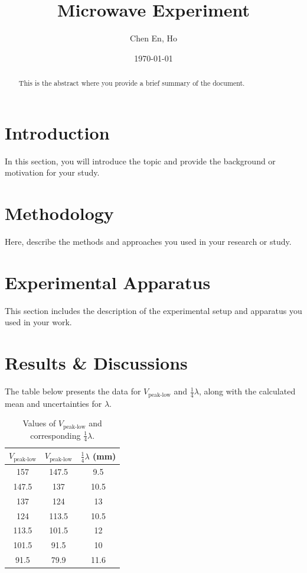 \documentclass{article}
\title{Microwave Experiment}
\author{Chen En, Ho}
\date{\today}
\begin{document}
\maketitle

\begin{abstract}
This is the abstract where you provide a brief summary of the document.
\end{abstract}

\section{Introduction}
In this section, you will introduce the topic and provide the background or motivation for your study.

\section{Methodology}
Here, describe the methods and approaches you used in your research or study.

\section{Experimental Apparatus}
This section includes the description of the experimental setup and apparatus you used in your work.

\section{Results \& Discussions}

The table below presents the data for \( V_{\text{peak-low}} \) and \( \frac{1}{4} \lambda \), along with the calculated mean and uncertainties for \( \lambda \).

\begin{table}[H]
    \centering
    \begin{tabular}{|c|c|c|}
        \hline
        \( V_{\text{peak-low}} \) & \( V_{\text{peak-low}} \) & \( \frac{1}{4} \lambda \) (mm) \\
        \hline
        157 & 147.5 & 9.5 \\
        147.5 & 137 & 10.5 \\
        137 & 124 & 13 \\
        124 & 113.5 & 10.5 \\
        113.5 & 101.5 & 12 \\
        101.5 & 91.5 & 10 \\
        91.5 & 79.9 & 11.6 \\
        \hline
    \end{tabular}
    \caption{Values of \( V_{\text{peak-low}} \) and corresponding \( \frac{1}{4} \lambda \).}
\end{table}
\end{document}
